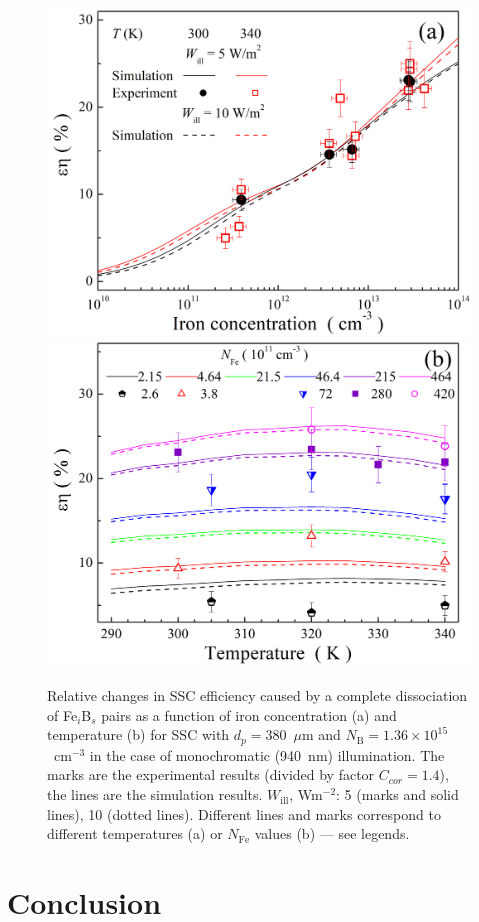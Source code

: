 \documentclass[a4paper,fleqn]{cas-sc}
\begin{document}
\begin{figure}
	\centering
     \includegraphics[width=0.4\linewidth]{Fig11a.png}
     \includegraphics[width=0.4\linewidth]{Fig11b.png}
	  \caption{Relative changes in SSC efficiency caused by a complete
       dissociation of Fe$_i$B$_s$ pairs as a function of iron concentration (a) and
       temperature (b) for SSC with $d_p=380$~$\mu$m and $N_\mathrm{B}=1.36\times10^{15}$~cm$^{-3}$
       in the case of monochromatic (940~nm) illumination.
       The marks are the experimental results (divided by factor $C_{cor}=1.4$), the lines are the simulation results.
       $W_\mathrm{ill}$, Wm$^{-2}$: 5 (marks and solid lines), 10 (dotted lines).
       Different lines and marks correspond to different temperatures (a) or $N_\mathrm{Fe}$ values (b) --- see legends.
}\label{fig11}
\end{figure}

\section{Conclusion}



\end{document}
